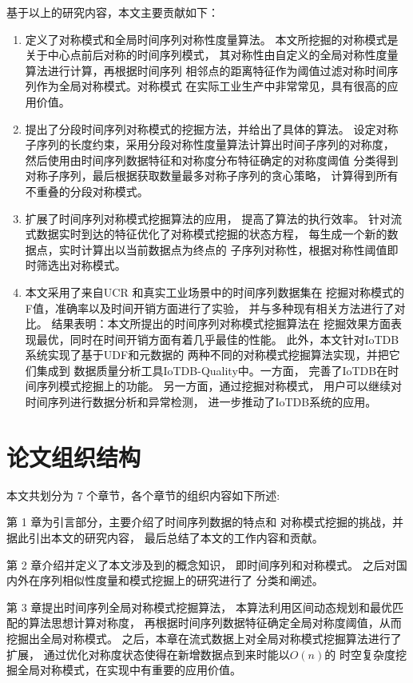 基于以上的研究内容，本文主要贡献如下：
\begin{enumerate}
\item 定义了对称模式和全局时间序列对称性度量算法。
本文所挖掘的对称模式是关于中心点前后对称的时间序列模式，
其对称性由自定义的全局对称性度量算法进行计算，再根据时间序列
相邻点的距离特征作为阈值过滤对称时间序列作为全局对称模式。对称模式
在实际工业生产中非常常见，具有很高的应用价值。
\item 提出了分段时间序列对称模式的挖掘方法，并给出了具体的算法。
设定对称子序列的长度约束，采用分段对称性度量算法计算出时间子序列的对称度，
然后使用由时间序列数据特征和对称度分布特征确定的对称度阈值
分类得到对称子序列，最后根据获取数量最多对称子序列的贪心策略，
计算得到所有不重叠的分段对称模式。
\item 扩展了时间序列对称模式挖掘算法的应用，
提高了算法的执行效率。
针对流式数据实时到达的特征优化了对称模式挖掘的状态方程，
每生成一个新的数据点，实时计算出以当前数据点为终点的
子序列对称性，根据对称性阈值即时筛选出对称模式。
\item 本文采用了来自UCR\cite{DBLP:journals/ieeejas/DauBKYZGRK19}
和真实工业场景中的时间序列数据集在
挖掘对称模式的F值，准确率以及时间开销方面进行了实验，
并与多种现有相关方法进行了对比。
结果表明：本文所提出的时间序列对称模式挖掘算法在
挖掘效果方面表现最优，同时在时间开销方面有着几乎最佳的性能。
此外，本文针对IoTDB系统实现了基于UDF和元数据的
两种不同的对称模式挖掘算法实现，并把它们集成到
数据质量分析工具IoTDB-Quality中。一方面，
完善了IoTDB在时间序列模式挖掘上的功能。
另一方面，通过挖掘对称模式，
用户可以继续对时间序列进行数据分析和异常检测，
进一步推动了IoTDB系统的应用。
\end{enumerate}

\section{论文组织结构}

本文共划分为 7 个章节，各个章节的组织内容如下所述:

第 1 章为引言部分，主要介绍了时间序列数据的特点和
对称模式挖掘的挑战，并据此引出本文的研究内容，
最后总结了本文的工作内容和贡献。

第 2 章介绍并定义了本文涉及到的概念知识，
即时间序列和对称模式。
之后对国内外在序列相似性度量和模式挖掘上的研究进行了
分类和阐述。

第 3 章提出时间序列全局对称模式挖掘算法，
本算法利用区间动态规划和最优匹配的算法思想计算对称度，
再根据时间序列数据特征确定全局对称度阈值，从而挖掘出全局对称模式。
之后，本章在流式数据上对全局对称模式挖掘算法进行了扩展，
通过优化对称度状态使得在新增数据点到来时能以$O(n)$的
时空复杂度挖掘全局对称模式，在实现中有重要的应用价值。

